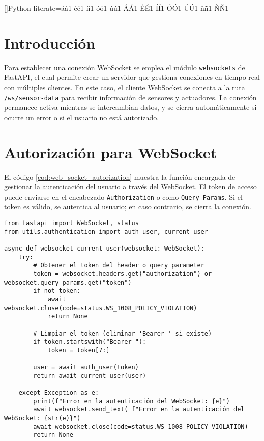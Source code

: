 []{Python}{
literate={á}{{\'a}}1 {é}{{\'e}}1 {í}{{\'i}}1 {ó}{{\'o}}1 {ú}{{\'u}}1
{Á}{{\'A}}1 {É}{{\'E}}1 {Í}{{\'I}}1 {Ó}{{\'O}}1 {Ú}{{\'U}}1
{ñ}{{\~n}}1 {Ñ}{{\~N}}1
}


\section{Introducción}

Para establecer una conexión WebSocket se emplea el módulo \texttt{websockets}
de FastAPI, el cual permite crear un servidor que gestiona conexiones en tiempo
real con múltiples clientes. En este caso, el cliente WebSocket se conecta a la
ruta \texttt{/ws/sensor-data} para recibir información de sensores y
actuadores. La conexión permanece activa mientras se intercambian datos, y se
cierra automáticamente si ocurre un error o si el usuario no está autorizado.%

\section{Autorización para WebSocket}

El código \ref{cod:web_socket_autorization} muestra la función encargada de
gestionar la autenticación del usuario a través del WebSocket. El token de
acceso puede enviarse en el encabezado \texttt{Authorization} o como
\texttt{Query Params}. Si el token es válido, se autentica al usuario; en caso
contrario, se cierra la conexión.

\begin{lstlisting}[label=cod:web_socket_autorization,caption=Autorización para WebSocket. , language=PythonUTF8]
from fastapi import WebSocket, status
from utils.authentication import auth_user, current_user
    
async def websocket_current_user(websocket: WebSocket):
    try:
        # Obtener el token del header o query parameter
        token = websocket.headers.get("authorization") or websocket.query_params.get("token")
        if not token:
            await websocket.close(code=status.WS_1008_POLICY_VIOLATION)
            return None
                
        # Limpiar el token (eliminar 'Bearer ' si existe)
        if token.startswith("Bearer "):
            token = token[7:]
                
        user = await auth_user(token)
        return await current_user(user)
           
    except Exception as e:
        print(f"Error en la autenticación del WebSocket: {e}")
        await websocket.send_text( f"Error en la autenticación del WebSocket: {str(e)}")
        await websocket.close(code=status.WS_1008_POLICY_VIOLATION)
        return None
\end{lstlisting}

